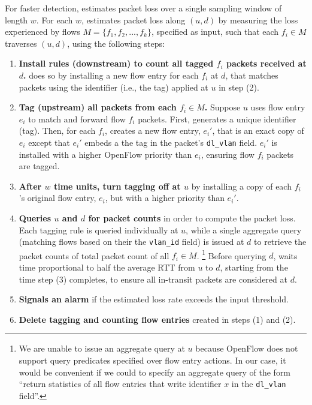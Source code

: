 For faster detection, \pcnt
estimates packet loss over a single sampling window of length $w$.  For each $w$, \pcnt estimates packet loss along $(u,d)$ by measuring the loss experienced by flows $M=\{f_1,f_2, ...,f_k\}$, 
specified as input, such that each $f_i \in M$ traverses $(u,d)$, using the following steps: 
\begin{enumerate}

	\item \textbf{Install rules (downstream) to count all tagged $f_i$ packets received at $d$.} \pcnt does so by installing a new flow entry for each $f_i$ at $d$, 
	that matches packets using the identifier (i.e., the tag) applied at $u$ in step (2).

	\item \textbf{Tag (upstream) all packets from each $f_i \in M$.} Suppose $u$ uses flow entry $e_i$ to match and forward flow $f_i$ packets. First, \pcnt generates
	a unique identifier (tag). Then, for each $f_i$, \pcnt creates a new flow entry, $e_i'$, that is an exact copy of $e_i$ except that $e_i'$ embeds a the tag in the packet's 
	{\tt dl\_vlan} field. $e_i'$ is installed with a higher OpenFlow priority than $e_i$, ensuring flow $f_i$ packets are tagged.  


	\item \textbf{After $w$ time units, turn tagging off at $u$} by installing a copy of each $f_i$'s original flow entry, $e_i$, but with a higher priority than $e_i'$.
	
	\item \textbf{Queries $u$ and $d$ for packet counts} in order to compute the packet loss.  Each tagging rule is queried individually at $u$, while a single aggregate query (matching flows based
	on their the {\tt vlan\_id} field) is issued at $d$ to retrieve the packet counts of total packet count of all $f_i \in M$. 
	\footnote{We are unable to issue an aggregate query at $u$ because OpenFlow does not support query predicates specified over flow entry actions.  In our case, it would be convenient if we could
	to specify an aggregate query of the form ``return statistics of all flow entries that write identifier $x$ in the {\tt dl\_vlan} field''. }
	Before querying $d$, \pcnt waits time proportional to half the average RTT from $u$ to $d$, starting from the time step (3) completes, to ensure all in-transit packets are considered at $d$. 

	\item \textbf{Signals an alarm} if the estimated loss rate exceeds the input threshold.

	\item \textbf{Delete tagging and counting flow entries} created in steps (1) and (2).
	
\end{enumerate}

